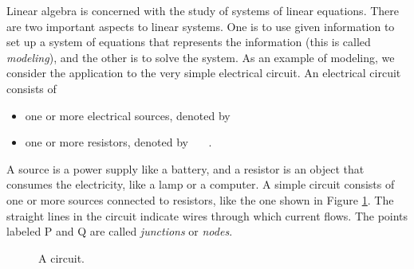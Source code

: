 \label{sec:intro_linear_systems}


\vspace*{-17 pt}

\vspace*{13 pt}


Linear algebra is concerned with the study of systems of linear equations. There are two important aspects to linear systems. One is to use given information to set up a system of equations that represents the information (this is called \emph{modeling}), and the other is to solve the system.  As an example of modeling, we consider the application to the very simple electrical circuit. An electrical circuit consists of
\begin{itemize}
\item one or more electrical sources, denoted by \ \ \  
\item one or more resistors, denoted by \ \ \ 
.
\end{itemize}
A source is a power supply like a battery, and a resistor is an object that consumes the electricity, like a lamp or a computer. A simple circuit consists of one or more sources connected to resistors, like the one shown in Figure \ref{F:circuit1}. The straight lines in the circuit indicate wires through which current flows. The points labeled P and Q are called \emph{junctions} or \emph{nodes}.
\begin{figure}[h]
\begin{center}
\end{center}
\caption{A circuit.}
\label{F:circuit1}
\end{figure}

